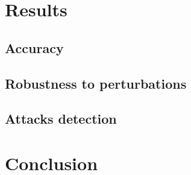 \documentclass[10pt,twocolumn,letterpaper]{article}
\begin{document}
\paragraph{}


\section{Results}
\label{sec:results}

\subsection{Accuracy}

\paragraph{} 

\subsection{Robustness to perturbations}

\paragraph{} 

\subsection{Attacks detection}

\paragraph{}


\section{Conclusion}
\label{sec:conclusion}

{\small


}
\end{document}
